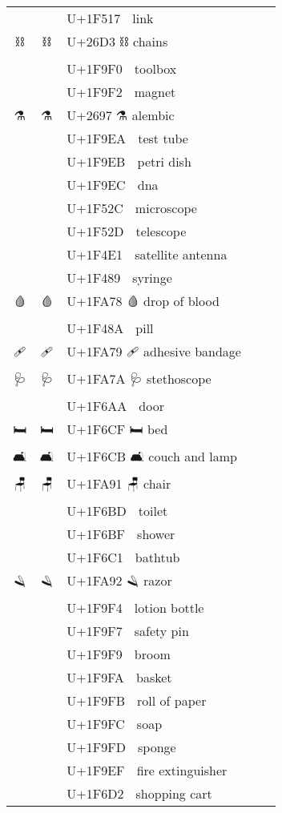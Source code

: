 \documentclass[a4paper,12pt]{article}
\newcommand{\fontA}[1]{{\fontspec[RawFeature={mode=harf,+dist,+ccmp}]{Segoe UI Emoji} #1}}
\newcommand{\fontB}[1]{{\fontspec[RawFeature={mode=harf,+dist,+ccmp}]{Noto Color Emoji} #1}}
\begin{document}
\begin{longtable}[c]{ccp{0.8\linewidth}}
\fontA{🔗}&\fontB{🔗}&U+1F517 🔗 link\\
\fontA{⛓}&\fontB{⛓}&U+26D3 ⛓ chains\\
\fontA{🧰}&\fontB{🧰}&U+1F9F0 🧰 toolbox\\
\fontA{🧲}&\fontB{🧲}&U+1F9F2 🧲 magnet\\
\fontA{⚗}&\fontB{⚗}&U+2697 ⚗ alembic\\
\fontA{🧪}&\fontB{🧪}&U+1F9EA 🧪 test tube\\
\fontA{🧫}&\fontB{🧫}&U+1F9EB 🧫 petri dish\\
\fontA{🧬}&\fontB{🧬}&U+1F9EC 🧬 dna\\
\fontA{🔬}&\fontB{🔬}&U+1F52C 🔬 microscope\\
\fontA{🔭}&\fontB{🔭}&U+1F52D 🔭 telescope\\
\fontA{📡}&\fontB{📡}&U+1F4E1 📡 satellite antenna\\
\fontA{💉}&\fontB{💉}&U+1F489 💉 syringe\\
\fontA{🩸}&\fontB{🩸}&U+1FA78 🩸 drop of blood\\
\fontA{💊}&\fontB{💊}&U+1F48A 💊 pill\\
\fontA{🩹}&\fontB{🩹}&U+1FA79 🩹 adhesive bandage\\
\fontA{🩺}&\fontB{🩺}&U+1FA7A 🩺 stethoscope\\
\fontA{🚪}&\fontB{🚪}&U+1F6AA 🚪 door\\
\fontA{🛏}&\fontB{🛏}&U+1F6CF 🛏 bed\\
\fontA{🛋}&\fontB{🛋}&U+1F6CB 🛋 couch and lamp\\
\fontA{🪑}&\fontB{🪑}&U+1FA91 🪑 chair\\
\fontA{🚽}&\fontB{🚽}&U+1F6BD 🚽 toilet\\
\fontA{🚿}&\fontB{🚿}&U+1F6BF 🚿 shower\\
\fontA{🛁}&\fontB{🛁}&U+1F6C1 🛁 bathtub\\
\fontA{🪒}&\fontB{🪒}&U+1FA92 🪒 razor\\
\fontA{🧴}&\fontB{🧴}&U+1F9F4 🧴 lotion bottle\\
\fontA{🧷}&\fontB{🧷}&U+1F9F7 🧷 safety pin\\
\fontA{🧹}&\fontB{🧹}&U+1F9F9 🧹 broom\\
\fontA{🧺}&\fontB{🧺}&U+1F9FA 🧺 basket\\
\fontA{🧻}&\fontB{🧻}&U+1F9FB 🧻 roll of paper\\
\fontA{🧼}&\fontB{🧼}&U+1F9FC 🧼 soap\\
\fontA{🧽}&\fontB{🧽}&U+1F9FD 🧽 sponge\\
\fontA{🧯}&\fontB{🧯}&U+1F9EF 🧯 fire extinguisher\\
\fontA{🛒}&\fontB{🛒}&U+1F6D2 🛒 shopping cart\\

\end{longtable}
\end{document}

